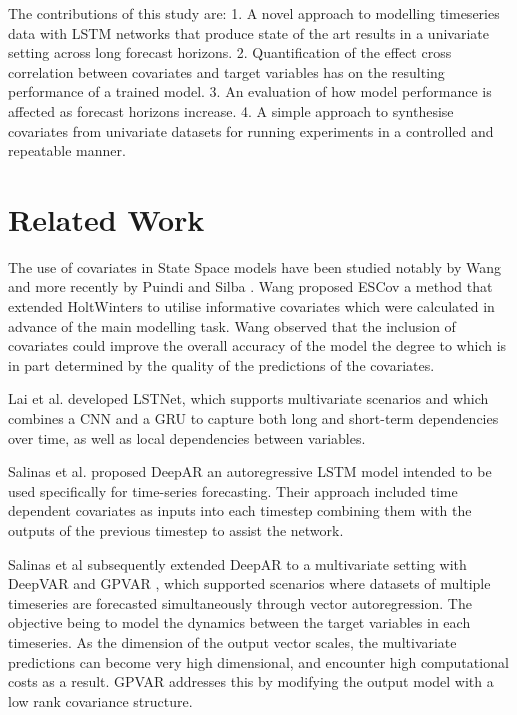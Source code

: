 \documentclass[letterpaper]{article}
\begin{document}
The contributions of this study are:
1. A novel approach to modelling timeseries data with LSTM networks that produce state of the art results in a univariate setting across 
long forecast horizons.
2. Quantification of the effect cross correlation between covariates and target variables has on the resulting performance of a trained model.
3. An evaluation of how model performance is affected as forecast horizons increase. 
4. A simple approach to synthesise covariates from univariate datasets for running experiments in a controlled and repeatable manner.


\section{Related Work}
The use of covariates in State Space models have been studied notably by Wang\cite{wang2006} and more recently by Puindi and Silba 
\cite{puindi2020dynamic}. Wang proposed ESCov a method that extended HoltWinters to utilise informative covariates which were calculated in advance 
of the main modelling task. Wang observed that the inclusion of covariates could improve the overall accuracy of the model the degree to which is in part
determined by the quality of the predictions of the covariates. 

Lai et al. \cite{lai2018modeling} developed LSTNet, which supports multivariate scenarios and which combines a CNN and a GRU to capture both 
long and short-term dependencies over time, as well as local dependencies between variables. 

Salinas et al. \cite{salinas2019deepar} proposed DeepAR an autoregressive LSTM model intended to be used specifically 
for time-series forecasting. Their approach included time dependent covariates as inputs into each timestep combining them 
with the outputs of the previous timestep to assist the network.

Salinas et al subsequently extended DeepAR to a multivariate setting with DeepVAR and GPVAR \cite{salinas2019highdimensional}, which supported 
scenarios where datasets of multiple timeseries are forecasted simultaneously through vector autoregression. The objective being to model the 
dynamics between the target variables in each timeseries. As the dimension of the output vector scales, the multivariate predictions can 
become very high dimensional, and encounter high computational costs as a result.  GPVAR addresses this by modifying the output model 
with a low rank covariance structure. 
\end{document}

